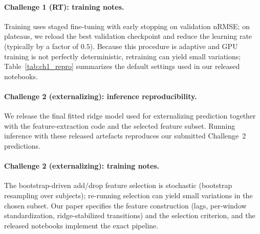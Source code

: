 \documentclass[12pt]{article}
\begin{document}
\paragraph{Challenge 1 (RT): training notes.}
Training uses staged fine-tuning with early stopping on validation nRMSE; on plateaus, we reload the best validation
checkpoint and reduce the learning rate (typically by a factor of $0.5$). Because this procedure is adaptive and GPU
training is not perfectly deterministic, retraining can yield small variations; Table~\ref{tab:ch1_repro} summarizes the
default settings used in our released notebooks.


\paragraph{Challenge 2 (externalizing): inference reproducibility.}
We release the final fitted ridge model used for externalizing prediction together with the feature-extraction code and the
selected feature subset. Running inference with these released artefacts reproduces our submitted Challenge~2 predictions.

\paragraph{Challenge 2 (externalizing): training notes.}
The bootstrap-driven add/drop feature selection is stochastic (bootstrap resampling over subjects); re-running selection can
yield small variations in the chosen subset. Our paper specifies the feature construction (lags, per-window standardization,
ridge-stabilized transitions) and the selection criterion, and the released notebooks implement the exact pipeline.
\end{document}
